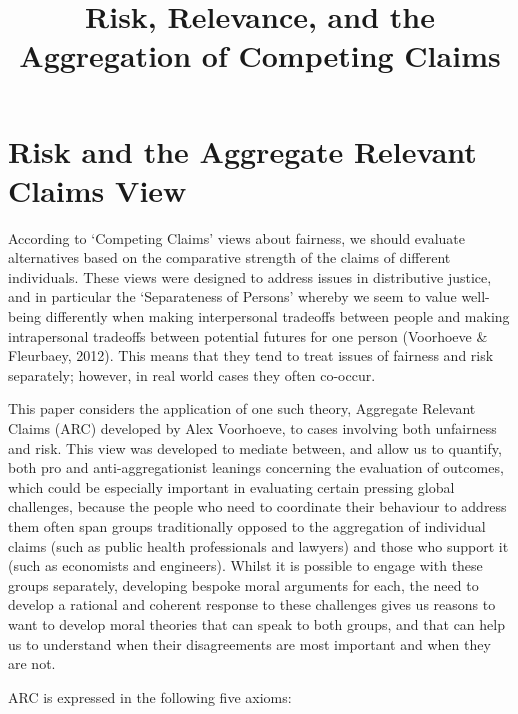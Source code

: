 \documentclass[man,11pt,a4paper]{apa7}
\title{Risk, Relevance, and the Aggregation of Competing Claims}
\begin{document}
\maketitle
\makeatletter
\renewcommand\@makefntext[1]{\linespread{1}\selectfont\raggedright\textsuperscript{\@thefnmark}~#1}
\makeatother

\section{Risk and the Aggregate Relevant Claims View}

According to `Competing Claims' views about fairness, we should evaluate alternatives based on the comparative strength of the claims of different individuals. These views were designed to address issues in distributive justice, and in particular the `Separateness of Persons' whereby we seem to value well-being differently when making interpersonal tradeoffs between people and making intrapersonal tradeoffs between potential futures for one person (Voorhoeve \& Fleurbaey, 2012). This means that they tend to treat issues of fairness and risk separately; however, in real world cases they often co-occur.

This paper considers the application of one such theory, Aggregate Relevant Claims (ARC) developed by Alex Voorhoeve, to cases involving both unfairness and risk. This view was developed to mediate between, and allow us to quantify, both pro and anti-aggregationist leanings concerning the evaluation of outcomes, which could be especially important in evaluating certain pressing global challenges, because the people who need to coordinate their behaviour to address them often span groups traditionally opposed to the aggregation of individual claims (such as public health professionals and lawyers) and those who support it (such as economists and engineers). Whilst it is possible to engage with these groups separately, developing bespoke moral arguments for each, the need to develop a rational and coherent response to these challenges gives us reasons to want to develop moral theories that can speak to both groups, and that can help us to understand when their disagreements are most important and when they are not.

ARC is expressed in the following five axioms:
\end{document}
